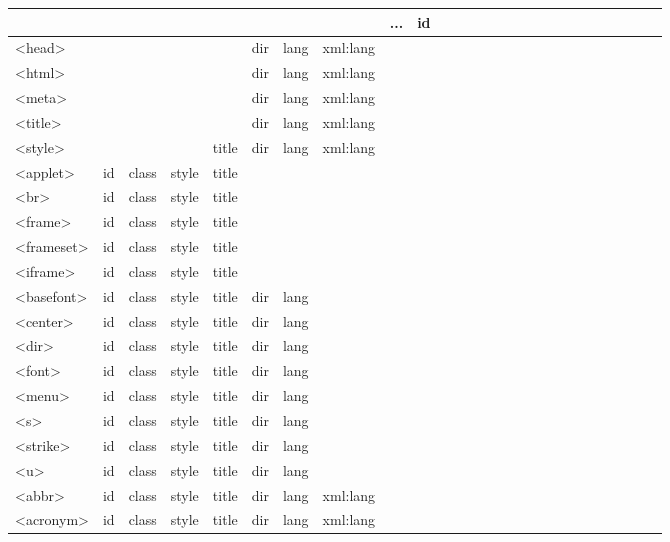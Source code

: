 \begin{longtable}{|l|l|l|l|l|l|l|l|l|l|}
\multicolumn{10}{r}{...}
\endhead
\hline

\endfirsthead
\multicolumn{10}{r}{...}
\endfoot
\endlastfoot
\hline
<param>		&id	    &		 &		 &		&	 &	 	&		  &			&		\\
\hline
<head>		&	    &		 &		 &		& dir & 	lang	& xml:lang & 			&		 \\
\hline
<html>		&	    &		 &		 &		& dir & 	lang	& xml:lang & 			&		 \\
\hline
<meta>		&	    &		 &		 &		& dir & 	lang	& xml:lang & 			&		 \\
\hline
<title>		&	    &		 &		 &		& dir & 	lang	& xml:lang & 			&		 \\
\hline
<style>		&	    &		 &		 &	title	& dir & 	lang	& xml:lang & 			&		 \\
\hline
<applet>		&	id &	class &	style &	title &  	 & 		& 	 	   & 			&		 \\
\hline
<br>			&	id &	class &	style &	title &  	 & 		& 	 	   & 			&		 \\
\hline
<frame>		&	id &	class &	style &	title &  	 & 		& 	 	   & 			&		 \\
\hline
<frameset>	&	id &	class &	style &	title &  	 & 		& 	 	   & 			&		 \\
\hline
<iframe>		&	id &	class &	style &	title &  	 & 		& 	 	   & 			&		 \\
\hline
<basefont>	&	id &	class &	style &	title & dir & 	lang	& 	 & 			&		 \\
\hline
<center>		&	id &	class &	style &	title & dir & 	lang	& 	 & 			&		 \\
\hline
<dir>		&	id &	class &	style &	title & dir & 	lang	& 	 & 			&		 \\
\hline
<font>		&	id &	class &	style &	title & dir & 	lang	& 	 & 			&		 \\
\hline
<menu>		&	id &	class &	style &	title & dir & 	lang	& 	 & 			&		 \\
\hline
<s>			&	id &	class &	style &	title & dir & 	lang	& 	 & 			&		 \\
\hline
<strike>		&	id &	class &	style &	title & dir & 	lang	& 	 & 			&		 \\
\hline
<u>			&	id &	class &	style &	title & dir & 	lang	& 	 & 			&		 \\
\hline
<abbr>		&	id &	class &	style &	title & dir & 	lang	& xml:lang & 			&		 \\
\hline
<acronym>	&	id &	class &	style &	title & dir & 	lang	& xml:lang & 			&		 \\

\end{longtable}
